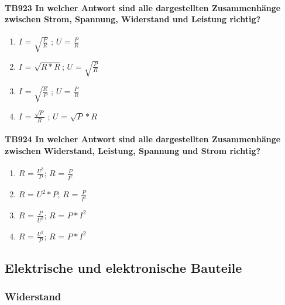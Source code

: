 \documentclass[8pt]{article}
\begin{document}
\begin{enumerate}
\begin{enumerate}[nolistsep,label=\Alph*]
\paragraph*{TB923 In welcher Antwort sind alle dargestellten Zusammenhänge zwischen Strom, Spannung, Widerstand und Leistung richtig?}
\begin{enumerate}[nolistsep,label=\Alph*]
\item $I$ = $\sqrt{\frac{P}{R}}$ ; $U$ = $\frac{P}{R}$
\item $I$ = $\sqrt{R * R}$; $U$ = $\sqrt{\frac{P}{R}}$
\item $I$ = $\sqrt{\frac{R}{P}}$ ; $U$ = $\frac{P}{R}$
\item $I$ = $\frac{\sqrt{P}}{R}$ ; $U$ = $\sqrt{P}*R$
\end{enumerate}

\paragraph*{TB924 In welcher Antwort sind alle dargestellten Zusammenhänge zwischen Widerstand, Leistung, Spannung und Strom richtig?}
\begin{enumerate}[nolistsep,label=\Alph*]
\item $R$ = $\frac{U^{2}}{P}$; $R$ = $\frac{P}{I^{2}}$
\item $R$ = $U^{2} * P$; $R$ = $\frac{P}{I^{2}}$
\item $R$ = $\frac{P}{U^{2}}$; $R$ = $P * I^{2}$
\item $R$ = $\frac{U^{2}}{P}$; $R$ = $P * I^{2}$
\end{enumerate}

\pagebreak
\subsection{Elektrische und elektronische Bauteile}
\subsubsection{Widerstand}

\end{enumerate}
\end{enumerate}
\end{document}
